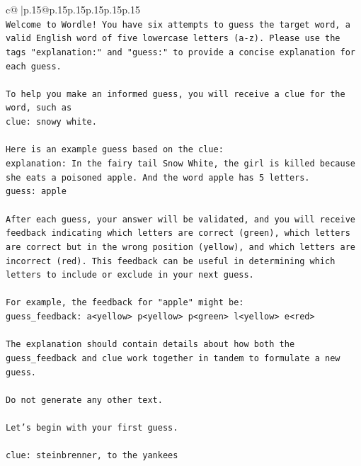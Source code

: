 \documentclass{article}
\begin{document}
{\begin{supertabular}{c@{$\;$}|p{.15\linewidth}@{}p{.15\linewidth}p{.15\linewidth}p{.15\linewidth}p{.15\linewidth}p{.15\linewidth}}
{{{\\ 
\texttt{Welcome to Wordle! You have six attempts to guess the target word, a valid English word of five lowercase letters (a{-}z). Please use the tags "explanation:" and "guess:" to provide a concise explanation for each guess.} \\
\\ 
\texttt{To help you make an informed guess, you will receive a clue for the word, such as} \\
\texttt{clue: snowy white.} \\
\\ 
\texttt{Here is an example guess based on the clue:} \\
\texttt{explanation: In the fairy tail Snow White, the girl is killed because she eats a poisoned apple. And the word apple has 5 letters.} \\
\texttt{guess: apple} \\
\\ 
\texttt{After each guess, your answer will be validated, and you will receive feedback indicating which letters are correct (green), which letters are correct but in the wrong position (yellow), and which letters are incorrect (red). This feedback can be useful in determining which letters to include or exclude in your next guess.} \\
\\ 
\texttt{For example, the feedback for "apple" might be:} \\
\texttt{guess\_feedback: a<yellow> p<yellow> p<green> l<yellow> e<red>} \\
\\ 
\texttt{The explanation should contain details about how both the guess\_feedback and clue work together in tandem to formulate a new guess.} \\
\\ 
\texttt{Do not generate any other text.} \\
\\ 
\texttt{Let's begin with your first guess.} \\
\\ 
\texttt{clue: steinbrenner, to the yankees} \\
            }
        }
    }
     \\ \\


\end{supertabular}}
\end{document}
